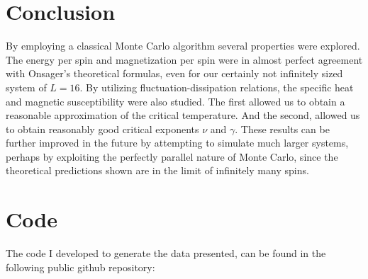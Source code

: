 \documentclass[12pt]{article}
\begin{document}
\section{Conclusion}

By employing a classical Monte Carlo algorithm several properties were explored. The energy per spin and magnetization per spin were in almost perfect agreement with Onsager's theoretical formulas, even for our certainly not infinitely sized system of $L=16$. By utilizing fluctuation-dissipation relations, the specific heat and magnetic susceptibility were also studied. The first allowed us to obtain a reasonable approximation of the critical temperature. And the second, allowed us to obtain reasonably good critical exponents $\nu$ and $\gamma$. These results can be further improved in the future by attempting to simulate much larger systems, perhaps by exploiting the perfectly parallel nature of Monte Carlo, since the theoretical predictions shown are in the limit of infinitely many spins.

\section{Code}

The code I developed to generate the data presented, can be found in the following public github repository: 






%
 
\end{document}
